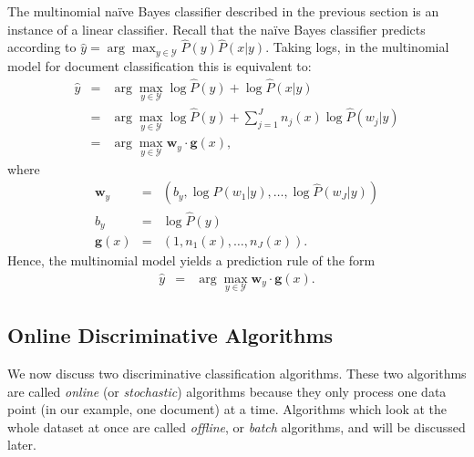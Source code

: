 \begin{remark}
The multinomial na\"ive Bayes classifier described in the previous section is an instance of a linear classifier.
Recall that the na\"ive Bayes classifier predicts according to ${\hat y} = \arg\max_{y \in \mathcal{Y}} \hat{P}(y) \hat{P}(x|y)$. 
Taking logs, in the multinomial model for document classification this is equivalent to: 
\begin{eqnarray}
{\hat y} &=& \arg\max_{y \in \mathcal{Y}} \log \hat{P}(y) + \log \hat{P}(x|y) \nonumber\\
&=& \arg\max_{y \in \mathcal{Y}} \log \hat{P}(y) + \sum_{j=1}^J n_j(x) \log \hat{P}(w_{j}|y)\nonumber\\
&=& \arg\max_{y \in \mathcal{Y}} \boldsymbol{w}_y \cdot \boldsymbol{g}(x), 
\end{eqnarray}
where
\begin{eqnarray}
\boldsymbol{w}_y &=& \left(b_y, \log \hat{P}(w_1 | y),\ldots, \log \hat{P}(w_J | y)\right) \nonumber\\
b_y &=& \log \hat{P}(y)\nonumber\\
\boldsymbol{g}(x) &=& (1, n_1(x), \ldots, n_J(x)).
\end{eqnarray}
Hence, the multinomial model yields a prediction rule of the form
\begin{eqnarray}
{\hat y} &=& \arg\max_{y \in \mathcal{Y}} \boldsymbol{w}_y \cdot \boldsymbol{g}(x). 
\end{eqnarray}
\end{remark}

%

\subsection{Online Discriminative Algorithms}

We now discuss two discriminative classification algorithms. These two algorithms are called \emph{online} (or \emph{stochastic}) algorithms because they only process one data point (in our example, one document) at a time. Algorithms which look at the whole dataset at once are called \emph{offline}, or \emph{batch} algorithms, and will be discussed later.

